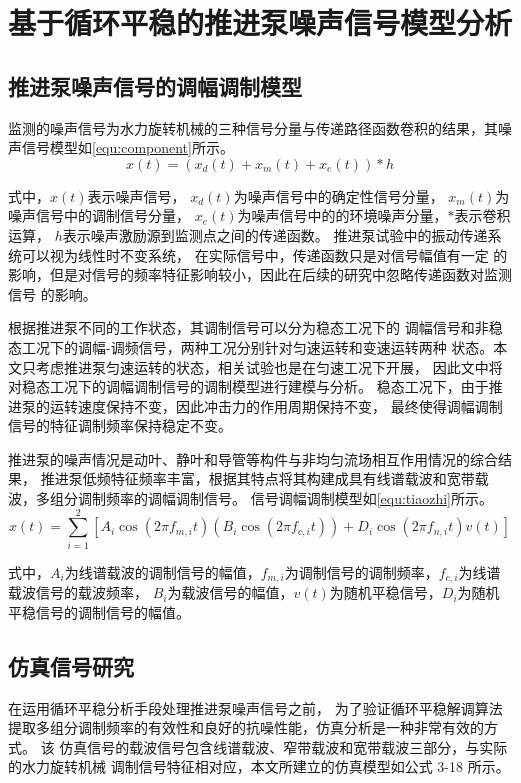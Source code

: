 \section{基于循环平稳的推进泵噪声信号模型分析}
\subsection{推进泵噪声信号的调幅调制模型}
监测的噪声信号为水力旋转机械的三种信号分量与传递路径函数卷积的结果，其噪声信号模型如\autoref{equ:component}所示。 
\begin{equation}
    \label{equ:component}
    x\left ( t \right ) =\left ( x_d\left ( t \right )+x_m\left ( t \right )+x_e\left ( t \right ) \right )\ast h 
\end{equation}

式中，$x\left ( t \right )$表示噪声信号，
$x_d\left ( t \right )$为噪声信号中的确定性信号分量，
$x_m\left ( t \right )$为噪声信号中的调制信号分量，
$x_e\left ( t \right )$为噪声信号中的的环境噪声分量，$\ast$表示卷积运算，
$h$表示噪声激励源到监测点之间的传递函数。 
推进泵试验中的振动传递系统可以视为线性时不变系统，
在实际信号中，传递函数只是对信号幅值有一定
的影响，但是对信号的频率特征影响较小，因此在后续的研究中忽略传递函数对监测信号
的影响。 

根据推进泵不同的工作状态，其调制信号可以分为稳态工况下的
调幅信号和非稳态工况下的调幅-调频信号，两种工况分别针对匀速运转和变速运转两种
状态。本文只考虑推进泵匀速运转的状态，相关试验也是在匀速工况下开展，
因此文中将对稳态工况下的调幅调制信号的调制模型进行建模与分析。 
稳态工况下，由于推进泵的运转速度保持不变，因此冲击力的作用周期保持不变，
最终使得调幅调制信号的特征调制频率保持稳定不变。

推进泵的噪声情况是动叶、静叶和导管等构件与非均匀流场相互作用情况的综合结果，
推进泵低频特征频率丰富，根据其特点将其构建成具有线谱载波和宽带载波，多组分调制频率的调幅调制信号。
信号调幅调制模型如\autoref{equ:tiaozhi}所示。
\begin{equation}
    \label{equ:tiaozhi}
    x\left ( t \right ) =\sum_{i=1}^{2}\left [ A_{i}\cos \left ( 2\pi f_{m,i}t  \right )\left ( B_{i}\cos\left ( 2\pi f_{c,i}t  \right )   \right )+D_{i}\cos\left ( 2\pi f_{n,i}t  \right )v\left ( t \right )      \right ]  
\end{equation}

式中，$A_i$为线谱载波的调制信号的幅值，$f_{m,i}$为调制信号的调制频率，$f_{c,i}$为线谱载波信号的载波频率，
$B_i$为载波信号的幅值，$v\left ( t \right )$为随机平稳信号，$D_i$为随机平稳信号的调制信号的幅值。
\subsection{仿真信号研究}
在运用循环平稳分析手段处理推进泵噪声信号之前，
为了验证循环平稳解调算法提取多组分调制频率的有效性和良好的抗噪性能，仿真分析是一种非常有效的方
式。
该
仿真信号的载波信号包含线谱载波、窄带载波和宽带载波三部分，与实际的水力旋转机械
调制信号特征相对应，本文所建立的仿真模型如公式 3-18 所示。 

